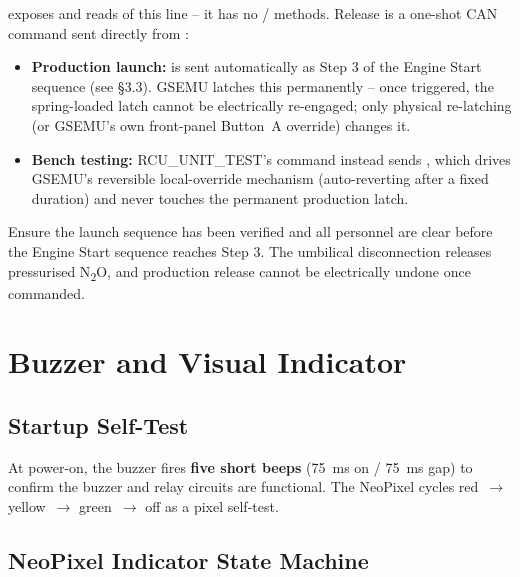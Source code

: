 ﻿\documentclass[11pt,letterpaper]{article}
\begin{document}
\begin{sloppypar}
 exposes  and  reads of
this line -- it has no / methods.  Release is a
one-shot CAN command sent directly from :

\begin{itemize}[nosep]
  \item \textbf{Production launch:}  is sent
        automatically as Step 3 of the Engine Start sequence (see §3.3).
        GSEMU latches this permanently -- once triggered, the spring-loaded
        latch cannot be electrically re-engaged; only physical re-latching
        (or GSEMU's own front-panel Button~A override) changes it.
  \item \textbf{Bench testing:} RCU\_UNIT\_TEST's  command
        instead sends , which drives GSEMU's
        reversible local-override mechanism (auto-reverting after a fixed
        duration) and never touches the permanent production latch.
\end{itemize}
\end{sloppypar}

\begin{warningbox}
Ensure the launch sequence has been verified and all personnel are clear
before the Engine Start sequence reaches Step 3.  The umbilical
disconnection releases pressurised N\textsubscript{2}O, and production
release cannot be electrically undone once commanded.
\end{warningbox}

\section{Buzzer and Visual Indicator}

\subsection{Startup Self-Test}

At power-on, the buzzer fires \textbf{five short beeps} (75~ms on / 75~ms gap)
to confirm the buzzer and relay circuits are functional.  The NeoPixel cycles
red~$\to$ yellow~$\to$ green~$\to$ off as a pixel self-test.

\subsection{NeoPixel Indicator State Machine}
\end{document}
